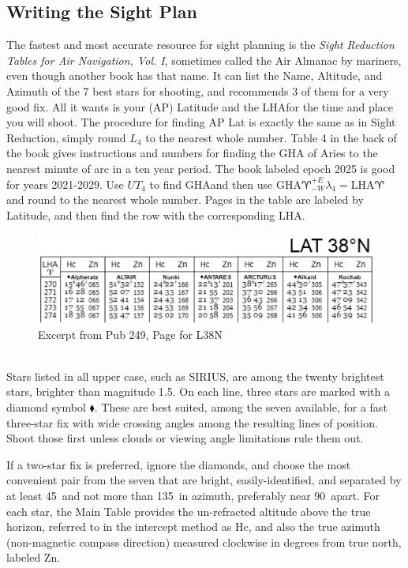 \documentclass{article}
\begin{document}
\subsection{Writing the Sight Plan}
The fastest and most accurate resource for sight planning is the \emph{Sight Reduction Tables for Air Navigation, Vol. I}, sometimes called the Air Almanac by mariners, even though another book has that name. It can list the Name, Altitude, and Azimuth of the 7 best stars for shooting, and recommends 3 of them for a very good fix. All it wants is your (AP) Latitude and the LHA\aries for the time and place you will shoot. The procedure for finding AP Lat is exactly the same as in Sight Reduction, simply round $L_4$ to the nearest whole number. Table 4 in the back of the book gives instructions and numbers for finding the GHA of Aries to the nearest minute of arc in a ten year period. The book labeled epoch 2025 is good for years 2021-2029. Use $UT_4$ to find GHA\aries and then use $\text{GHA}\aries^{+E}_{-W}\lambda_4=\text{LHA}\aries$ and round to the nearest whole number. Pages in the table are labeled by Latitude, and then find the row with the corresponding LHA\aries.
\begin{figure}[h]
    \centering
    \includegraphics[width=0.5\linewidth]{249excerpt.png}
    \caption{Excerpt from Pub 249, Page for L38N}
\end{figure}\\
Stars listed in all upper case, such as SIRIUS, are among the twenty brightest stars, brighter than magnitude 1.5. On each line, three stars are marked with a diamond symbol $\blacklozenge$. These are best suited, among the seven available, for a fast three-star fix with wide crossing angles among the resulting lines of position. Shoot those first unless clouds or viewing angle limitations rule them out. 

If a two-star fix is preferred, ignore the diamonds, and choose the most convenient pair from the seven that are bright, easily-identified, and separated by at least 45\degree\ and not more than 135\degree\ in azimuth, preferably near 90\degree\ apart. For each star, the Main Table provides the un-refracted altitude above the true horizon, referred to in the intercept method as Hc, and also the true azimuth (non-magnetic compass direction) measured clockwise in degrees from true north, labeled Zn.
\end{document}
